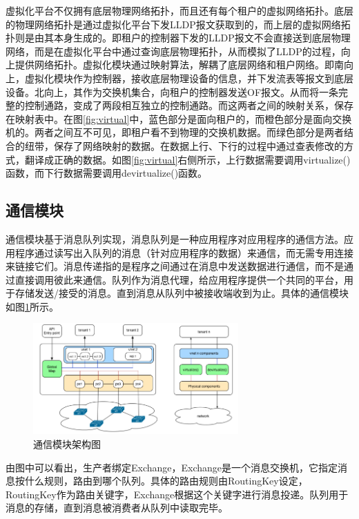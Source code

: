 虚拟化平台不仅拥有底层物理网络拓扑，而且还有每个租户的虚拟网络拓扑。底层的物理网络拓扑是通过虚拟化平台下发LLDP报文获取到的，而上层的虚拟网络拓扑则是由其本身生成的。即租户的控制器下发的LLDP报文不会直接送到底层物理网络，而是在虚拟化平台中通过查询底层物理拓扑，从而模拟了LLDP的过程，向上提供网络拓扑。虚拟化模块通过映射算法，解耦了底层网络和租户网络。即南向上，虚拟化模块作为控制器，接收底层物理设备的信息，并下发流表等报文到底层设备。北向上，其作为交换机集合，向租户的控制器发送OF报文。从而将一条完整的控制通路，变成了两段相互独立的控制通路。而这两者之间的映射关系，保存在映射表中。在图\ref{fig:virtual}中，蓝色部分是面向租户的，而橙色部分是面向交换机的。两者之间互不可见，即租户看不到物理的交换机数据。而绿色部分是两者结合的纽带，保存了网络映射的数据。在数据上行、下行的过程中通过查表修改的方式，翻译成正确的数据。如图\ref{fig:virtual}右侧所示，上行数据需要调用virtualize()函数，而下行数据需要调用devirtualize()函数。


\subsection{通信模块}
通信模块基于消息队列实现，消息队列是一种应用程序对应用程序的通信方法。应用程序通过读写出入队列的消息（针对应用程序的数据）来通信，而无需专用连接来链接它们。消息传递指的是程序之间通过在消息中发送数据进行通信，而不是通过直接调用彼此来通信。队列作为消息代理，给应用程序提供一个共同的平台，用于存储发送/接受的消息。直到消息从队列中被接收端收到为止。具体的通信模块如图\ref{fig:rabbitmq}所示。

\begin{figure}[!htb]
  \centering
  \includegraphics[width=0.7\textwidth]{logo/virtual-detail.png}
  \caption{通信模块架构图}
  \label{fig:rabbitmq}
\end{figure}

由图中可以看出，生产者绑定Exchange，Exchange是一个消息交换机，它指定消息按什么规则，路由到哪个队列。具体的路由规则由RoutingKey设定，RoutingKey作为路由关键字，Exchange根据这个关键字进行消息投递。队列用于消息的存储，直到消息被消费者从队列中读取完毕。

